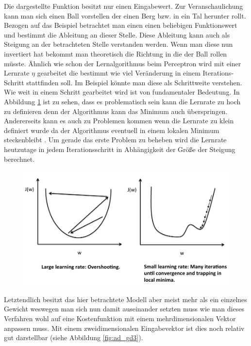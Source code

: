 Die dargestellte Funktion besitzt nur einen Eingabewert. Zur Veranschaulichung kann man sich einen Ball vorstellen der einen Berg bzw. in ein Tal herunter rollt. Bezogen auf das Beispiel betrachtet man einen einen beliebigen Funktionswert und bestimmt die Ableitung an dieser Stelle. Diese Ableitung kann auch als \glqq Steigung \grqq an der betrachteten Stelle verstanden werden. Wenn man diese nun invertiert hat bekommt man theoretisch die \glqq Richtung \grqq in die der Ball rollen müsste. Ähnlich wie schon der Lernalgorithmus beim Perceptron wird mit einer Lernrate $\eta$ gearbeitet die bestimmt wie viel Veränderung in einem Iterations-Schritt stattfinden soll. Im Beispiel könnte man diese als Schrittweite verstehen. 
Wie weit in einem Schritt gearbeitet wird ist von fundamentaler Bedeutung. In Abbildung \ref{fig:ad_gd2} ist zu sehen, dass es problematisch sein kann die Lernrate zu hoch zu definieren denn der Algorithmus kann das Minimum auch überspringen. Andererseits kann es auch zu Problemen kommen wenn die Lernrate zu klein definiert wurde da der Algorithmus eventuell in einem lokalen Minimum \glqq steckenbleibt \grqq . Um gerade das erste Problem zu beheben wird die Lernrate heutzutage in jedem Iterationsschritt in Abhängigkeit der Größe der Steigung berechnet. 

\begin{figure}[!htb]
	\centering
	\includegraphics[width=\linewidth]{img/adeline_learning_rate}
	\label{fig:ad_gd2}
\end{figure}

Letztendlich besitzt das hier betrachtete Modell aber meist mehr als ein einzelnes Gewicht weswegen man sich nun damit auseinander setzten muss wie man dieses Verfahren wohl auf eine Kostenfunktion mit einem mehrdimensionalen Vektor anpassen muss. Mit einem zweidimensionalen Eingabevektor ist dies noch relativ gut darstellbar (siehe Abbildung \ref{fig:ad_gd3}).

